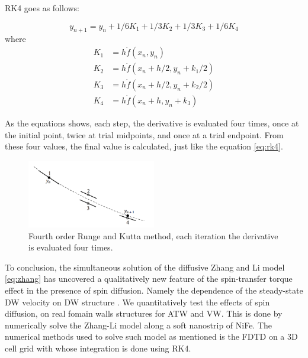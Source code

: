 RK4 goes as follows:

\begin{equation} \label{eq:rk4}
y_{n+1} = y_{n} + 1/6 K_{1} + 1/3 K_{2} +1/3 K_{3} + 1/6 K_{4}
\end{equation}
where
\begin{equation}
\begin{split} \label{eq:rksplit}
K_{1} &= h \dot f(x_{n}, y_{n}) \\
K_{2} &= h \dot f(x_{n} + h/2, y_{n} + k_{1}/2) \\
K_{3} &= h \dot f(x_{n} + h/2, y_{n} + k_{2}/2) \\
K_{4} &= h \dot f(x_{n} + h, y_{n} + k_{3})
\end{split}
\end{equation}

As the equations shows, each step, the derivative is evaluated four times, once at the initial point, twice at trial midpoints, and once at a trial endpoint. From these four values, the final value is calculated, just like the equation \ref{eq:rk4}.

\begin{figure}[htbp]
	\centering
		\includegraphics[width=0.5\textwidth]{Figures/rk4.png}
		\smallskip
	\caption[Fourth order Runge and Kutta Method]{Fourth order Runge and Kutta method, each iteration the derivative is evaluated four times.}
	\label{fig:kutta}
\end{figure}


\vspace{4.0em}

To conclusion, the simultaneous solution of the diffusive Zhang and Li model \ref{eq:zhang} has uncovered a qualitatively new feature of the spin-transfer torque effect in the presence of spin diffusion. Namely the dependence of the steady-state DW velocity on DW structure \cite{claudio}. We quantitatively test the effects of spin diffusion, on real fomain walls structures for ATW and VW. This is done by numerically solve the Zhang-Li model along a soft nanostrip of NiFe. The numerical methods used to solve such model as mentioned is the FDTD on a 3D cell grid with whose integration is done using RK4.







